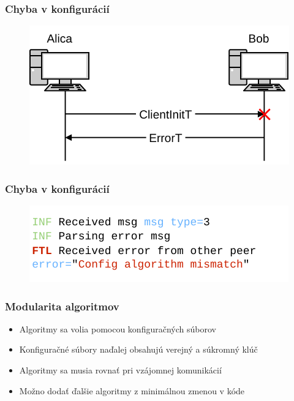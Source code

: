 \documentclass[%
  14pt,       				%
	t,                  %
	aspectratio=1610,   %
	unicode,						%
]{beamer}				    	%
\begin{document}
\begin{frame}[c]
	\frametitle{Chyba v konfigurácií}
	\begin{figure}
		\includegraphics[width=\textwidth]{presentation_pictures/comm_err.pdf}
	\end{figure}
\end{frame}

\begin{frame}[c]
	\frametitle{Chyba v konfigurácií}
	\begin{figure}[htbp]
		\centering
		\includegraphics[width=\textwidth]{presentation_pictures/client_err.pdf}
	\end{figure}
\end{frame}

\begin{frame}[c]
	\frametitle{Modularita algoritmov}
	\large{\begin{itemize}
			\item Algoritmy sa volia pomocou konfiguračných súborov
			\item Konfiguračné súbory naďalej obsahujú verejný a súkromný klúč
			\item Algoritmy sa musia rovnať pri vzájomnej komunikácií
			\item Možno dodať ďalšie algoritmy z minimálnou zmenou v kóde
		\end{itemize}}
\end{frame}
\end{document}
